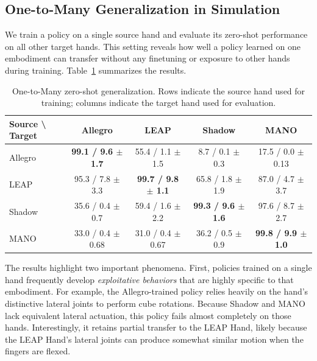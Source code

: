 \subsection{One-to-Many Generalization in Simulation}

We train a policy on a single source hand and evaluate its zero-shot performance on all other target hands. This setting reveals how well a policy learned on one embodiment can transfer without any finetuning or exposure to other hands during training. Table~\ref{tab:one_to_many} summarizes the results.

\begin{table}[h!]
\centering
\caption{One-to-Many zero-shot generalization. Rows indicate the source hand used for training; columns indicate the target hand used for evaluation.}
\label{tab:one_to_many}
\vspace{-2mm}
\setlength{\tabcolsep}{4pt}
\begin{tabular}{lcccc}
\toprule
\textbf{Source \textbackslash{} Target} & \textbf{Allegro} & \textbf{LEAP} & \textbf{Shadow} & \textbf{MANO} \\
\midrule
Allegro & \textbf{99.1 / 9.6 $\pm$ 1.7} & 55.4 / 1.1 $\pm$ 1.5 & 8.7 / 0.1 $\pm$ 0.3 & 17.5 / 0.0 $\pm$ 0.13 \\
LEAP    & 95.3 / 7.8 $\pm$ 3.3 & \textbf{99.7 / 9.8 $\pm$ 1.1} & 65.8 / 1.8 $\pm$ 1.9 & 87.0 / 4.7 $\pm$ 3.7 \\
Shadow  & 35.6 / 0.4 $\pm$ 0.7 & 59.4 / 1.6 $\pm$ 2.2 & \textbf{99.3 / 9.6 $\pm$ 1.6} & 97.6 / 8.7 $\pm$ 2.7 \\
MANO    & 33.0 / 0.4 $\pm$ 0.68 & 31.0 / 0.4 $\pm$ 0.67 & 36.2 / 0.5 $\pm$ 0.9 & \textbf{99.8 / 9.9 $\pm$ 1.0} \\
\bottomrule
\end{tabular}
\vspace{-2mm}
\end{table}

The results highlight two important phenomena. First, policies trained on a single hand frequently develop \emph{exploitative behaviors} that are highly specific to that embodiment. For example, the Allegro-trained policy relies heavily on the hand’s distinctive lateral joints to perform cube rotations. Because Shadow and MANO lack equivalent lateral actuation, this policy fails almost completely on those hands. Interestingly, it retains partial transfer to the LEAP Hand, likely because the LEAP Hand’s lateral joints can produce somewhat similar motion when the fingers are flexed.

